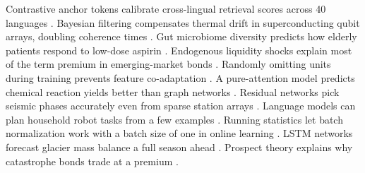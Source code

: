\documentclass{article}
\begin{document}
Contrastive anchor tokens calibrate cross-lingual retrieval scores across 40 languages \citep{solberg2022crosslingual}.
Bayesian filtering compensates thermal drift in superconducting qubit arrays, doubling coherence times \citep{tanabe2021thermal}.
Gut microbiome diversity predicts how elderly patients respond to low-dose aspirin \citep{lindqvist2019microbiome}.
Endogenous liquidity shocks explain most of the term premium in emerging-market bonds \citep{ferrante2017liquidity}.
Randomly omitting units during training prevents feature co-adaptation \citep{brandt2014omission}.
A pure-attention model predicts chemical reaction yields better than graph networks \citep{okoro2021attention}.
Residual networks pick seismic phases accurately even from sparse station arrays \citep{varga2020residual}.
Language models can plan household robot tasks from a few examples \citep{halvorsen2021fewshot}.
Running statistics let batch normalization work with a batch size of one in online learning \citep{duarte2019batchnorm}.
LSTM networks forecast glacier mass balance a full season ahead \citep{whitfield2018lstm}.
Prospect theory explains why catastrophe bonds trade at a premium \citep{nakamura2016prospect}.


\end{document}
